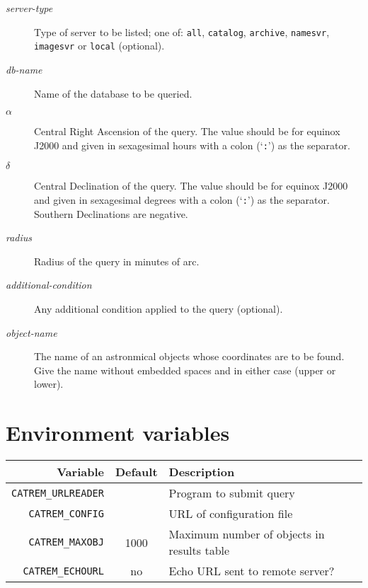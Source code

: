 \documentclass[twoside,11pt]{starlink}
\begin{document}
\begin{description}

  \item[\textit{server-type}\/] Type of server to be listed; one of:
   \texttt{all}, \texttt{catalog}, \texttt{archive}, \texttt{namesvr}, \texttt{imagesvr}
   or \texttt{local} (optional).

  \item[\textit{db-name}\/] Name of the database to be queried.

  \item[$\alpha$\/] Central Right Ascension of the query.  The value
   should be for equinox J2000 and given in sexagesimal hours with
   a colon (`\texttt{:}') as the separator.

  \item[$\delta$\/] Central Declination of the query.  The value
   should be for equinox J2000 and given in sexagesimal degrees with
   a colon (`\texttt{:}') as the separator.  Southern Declinations are
   negative.

  \item[\textit{radius}\/] Radius of the query in minutes of arc.

  \item[\textit{additional-condition}\/] Any additional condition applied
   to the query (optional).

  \item[\textit{object-name}\/] The name of an astronmical objects whose
   coordinates are to be found.  Give the name without embedded spaces
   and in either case (upper or lower).

\end{description}

\section*{Environment variables}

\begin{center}
\begin{tabular}{rcl}
Variable                & Default   &  Description \\ \hline
\texttt{CATREM\_URLREADER} &      & Program to submit query \\
\texttt{CATREM\_CONFIG}    &      & URL of configuration file \\
\texttt{CATREM\_MAXOBJ}    & 1000 & Maximum number of objects in results
table \\
\texttt{CATREM\_ECHOURL}   & no   & Echo URL sent to remote server? \\
\end{tabular}
\end{center}
\end{document}
